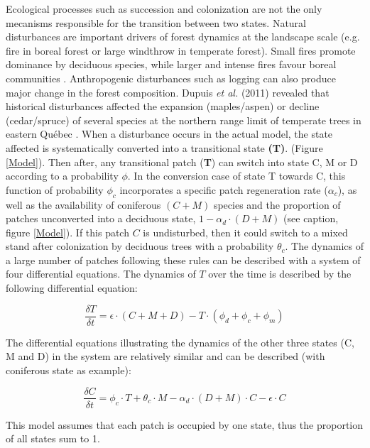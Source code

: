 Ecological processes such as succession and colonization are not the only
mecanisms responsible for the transition between two states. Natural
disturbances are important drivers of forest dynamics at the landscape scale
(e.g. fire in boreal forest or large windthrow in temperate forest). Small
fires promote dominance by deciduous species, while larger and intense fires
favour boreal communities \cite{Bergeron2004}. Anthropogenic disturbances such
as logging can also produce major change in the forest composition. Dupuis
\textit{et al.} (2011) revealed that historical disturbances affected the
expansion (maples/aspen) or decline (cedar/spruce) of several species at the
northern range limit of temperate trees in eastern Québec \cite{Dupuis2011}.
When a disturbance occurs in the actual model, the state affected is
systematically converted into a transitional state \textbf{(T)}. (Figure
\ref{Model}).  Then after, any transitional patch (\textbf{T}) can switch into
state C, M or D according to a probability $\phi$. In the conversion case of
state T towards C, this function of probability $\phi_c$ incorporates a
specific patch regeneration rate ($\alpha_c$), as well as the availability of
coniferous $(C + M)$ species and the proportion of patches unconverted into a
deciduous state, $1- \alpha_d \cdot (D + M)$ (see caption, figure
\ref{Model}). If this patch $C$ is undisturbed, then it could switch to a
mixed stand after colonization by deciduous trees with a probability
$\theta_c$. The dynamics of a large number of patches following these rules
can be described with a system of four differential equations. The dynamics of
$T$ over the time is described by the following differential equation:


\begin{equation}
 	\frac{\delta T}{\delta t} =\epsilon \cdot (C+M+D) - T \cdot (\phi_d + \phi_c + \phi_m)
\end{equation}

The differential equations illustrating the dynamics of the other three states
(C, M and D) in the system are relatively similar and can be described (with
coniferous state as example):


\begin{equation}
	\frac{\delta C}{\delta t} = \phi_c \cdot T + \theta_c \cdot M -\alpha_d \cdot (D+M)\cdot C - \epsilon \cdot C
\end{equation}

This model assumes that each patch is occupied by
one state, thus the proportion of all states sum to 1.\\

